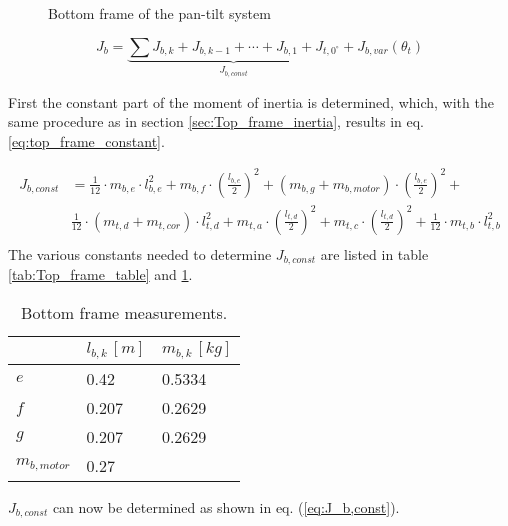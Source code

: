 \documentclass[../../main]{subfiles}
\begin{document}
\begin{figure}[H]
  \centering
  
  \caption{Bottom frame of the pan-tilt system}
  \label{fig:BottomFrame}
\end{figure}

\begin{equation}
  \label{eq:Base_frame_eq}
  J_b =
  \underbrace{
  \sum J_{b,k} + J_{b,k-1} + \dotsb + J_{b,1} + J_{t,0^{\circ}}}_\text{$J_{b,const}$} + J_{b,var}(\theta_t)
\end{equation}

First the constant part of the moment of inertia is determined, which, with the same procedure as in section \ref{sec:Top_frame_inertia}, results in eq. \eqref{eq:top_frame_constant}.

\begin{equation}
  \label{eq:top_frame_constant}
\begin{split}
  J_{b,const} &= \frac{1}{12}\cdot m_{b,e}\cdot l_{b,e}^2 + m_{b,f} \cdot \left( \frac{l_{b,e}}{2} \right)^2 + (m_{b,g}+m_{b,motor}) \cdot \left(\frac{l_{b,e}}{2}\right)^2 +\\
  & \frac{1}{12}\cdot (m_{t,d}+m_{t,cor})\cdot l_{t,d}^2 + m_{t,a}\cdot \left(\frac{l_{t,d}}{2}\right)^2 + m_{t,c}\cdot \left(\frac{l_{t,d}}{2}\right)^2 + \frac{1}{12}\cdot m_{t,b} \cdot l_{t,b}^2\\
\end{split}
\end{equation}
The various constants needed to determine $J_{b,const}$ are listed in table \ref{tab:Top_frame_table} and \ref{tab:Base_frame_table}.

\begin{table}[H]
\centering
\begin{tabular}{|l|l|l|}
\hline
  & $l_{b,k} \, \si{[m]}$ & $m_{b,k} \, \si{[kg]}$ \\
\hline
$e$           & 0.42  & 0.5334  \\
\hline
$f$           & 0.207  & 0.2629  \\
\hline
$g$           & 0.207 & 0.2629  \\
\hline
$m_{b,motor}$ & 0.27 & \\
\hline
\end{tabular}
\caption{Bottom frame measurements.}
    \label{tab:Base_frame_table}
\end{table}

$J_{b,const}$ can now be determined as shown in eq. (\ref{eq:J_b,const}).
\end{document}
